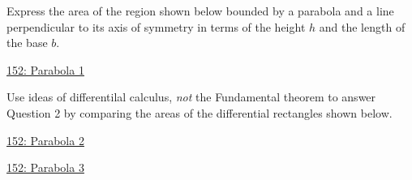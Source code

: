 \documentclass{ximera}
\begin{document}
\begin{question} \label{QOLDFKRerbttp}
Express the area of the region shown below bounded by a parabola and a line perpendicular to its axis of symmetry in terms of the height $h$ and the length of the base $b$.

\begin{onlineOnly}
    \begin{center}
\end{center}
\end{onlineOnly}

\href{https://www.desmos.com/calculator/kkdfpr66rt}{152: Parabola 1}

\end{question}


\begin{question}  \label{Q9erkmbzxee}
Use ideas of differentilal calculus, \emph{not} the Fundamental theorem to answer Question 2 by comparing the areas of the differential rectangles shown below.

\begin{onlineOnly}
    \begin{center}
\end{center}
\end{onlineOnly}

\href{https://www.desmos.com/calculator/pvskgbpnew}{152: Parabola 2}

\begin{onlineOnly}
    \begin{center}
\end{center}
\end{onlineOnly}

\href{https://www.desmos.com/calculator/0w37bixe79}{152: Parabola 3}

\end{question}
\end{document}
